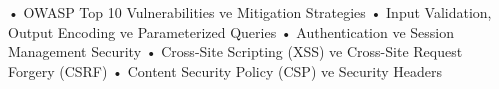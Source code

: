 • OWASP Top 10 Vulnerabilities ve Mitigation Strategies
• Input Validation, Output Encoding ve Parameterized Queries
• Authentication ve Session Management Security
• Cross-Site Scripting (XSS) ve Cross-Site Request Forgery (CSRF)
• Content Security Policy (CSP) ve Security Headers